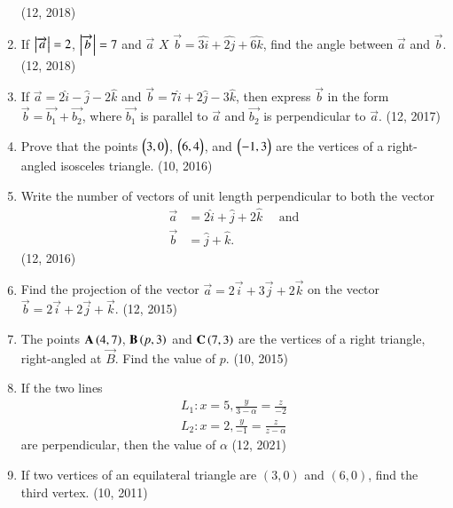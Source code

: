\begin{enumerate}[label=\thesubsection.\arabic*, ref=\thesubsection.\theenumi]
\hfill (12, 2018) 
\item If $\left\vert\overrightarrow{a}\right\vert=2$, $\left\vert\overrightarrow{b}\right\vert=7$ and  $\overrightarrow{a}$ $X$ $\overrightarrow{b} =\hat{3i}+\hat{2j}+\hat{6k}$, find the angle between $\overrightarrow{a}$ and $\overrightarrow{b}$.
\hfill (12, 2018) 
    \item If $\vec{a} = 2\hat{i} - \hat{j} - 2\hat{k}$ and $\vec{b} = 7\hat{i} + 2\hat{j} - 3\hat{k}$, then express $\vec{b}$ in the form $\vec{b} = \vec{b_1} + \vec{b_2}$, where $\vec{b_1}$ is parallel to $\vec{a}$ and $\vec{b_2}$ is perpendicular to $\vec{a}$. \hfill (12, 2017)
    \item Prove that the points $\begin{pmatrix}3,0\end{pmatrix}$, $\begin{pmatrix}6,4\end{pmatrix}$, and $\begin{pmatrix}-1,3\end{pmatrix}$ are the vertices of a right-angled isosceles triangle. \hfill (10, 2016)
\item Write the number of vectors of unit length perpendicular to both the vector
      \begin{align*}
          \vec{a} & = 2 \hat{i} + \hat{j} +2\hat{k} \quad\text{ and} \\
          \vec{b} & = \hat{j}+\hat{k}.
      \end{align*} \hfill (12, 2016)
\item Find the projection of the vector $\vec{a}=2\vec{i}+3\vec{j}+2\vec{k}$ on the vector $\vec{b}=2\vec{i}+2\vec{j}+\vec{k}$. \hfill (12, 2015)
\item The points $\mathbf{A}\left(4, 7\right)$, $\mathbf{B}\left(p, 3\right)$ and $\mathbf{C}\left(7, 3\right)$ are the vertices of a right triangle, right-angled at $\vec{B}$. Find the value of $p$. \hfill (10, 2015)
\item If the two lines
\begin{align}
      L_1 : x=5,\frac{y}{3-\alpha}=\frac{z}{-2}\\
     L_2 : x=2,\frac{y}{-1}=\frac{z}{z-\alpha} 
   \end{align}
are perpendicular, then the value of $\alpha$ 
\hfill (12, 2021)
    \item If two vertices of an equilateral triangle are $(3,0)$ and $(6,0)$, find the third vertex.   
\hfill (10, 2011)
\end{enumerate}
